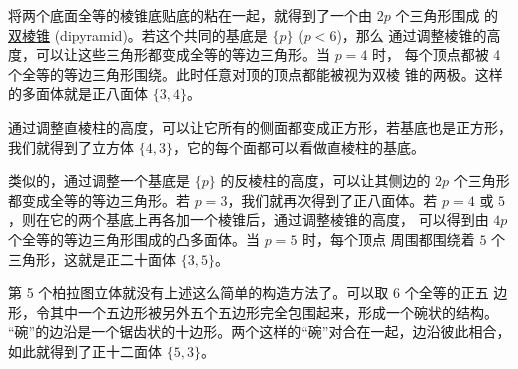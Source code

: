 \documentclass[cs4size,a4paper,adobefonts,openany]{ctexbook}
\newcommand{\pname}[1]{\underline{#1}}
\numberwithin{equation}{section}
\begin{document}
将两个底面全等的棱锥底贴底的粘在一起，就得到了一个由 $2p$ 个三角形围成
的\pname{双棱锥} (dipyramid)。若这个共同的基底是 $\{p\}$ ($p<6$)，那么
通过调整棱锥的高度，可以让这些三角形都变成全等的等边三角形。当 $p=4$ 时，
每个顶点都被 4 个全等的等边三角形围绕。此时任意对顶的顶点都能被视为双棱
锥的两极。这样的多面体就是正八面体 $\{3,4\}$。

通过调整直棱柱的高度，可以让它所有的侧面都变成正方形，若基底也是正方形，
我们就得到了立方体 $\{4,3\}$，它的每个面都可以看做直棱柱的基底。

类似的，通过调整一个基底是 $\{p\}$ 的反棱柱的高度，可以让其侧边的 $2p$
个三角形都变成全等的等边三角形。若 $p=3$，我们就再次得到了正八面体。若
$p=4$ 或 $5$，则在它的两个基底上再各加一个棱锥后，通过调整棱锥的高度，
可以得到由 $4p$ 个全等的等边三角形围成的凸多面体。当 $p=5$ 时，每个顶点
周围都围绕着 $5$ 个三角形，这就是正二十面体 $\{3,5\}$。

第 5 个柏拉图立体就没有上述这么简单的构造方法了。可以取 6 个全等的正五
边形，令其中一个五边形被另外五个五边形完全包围起来，形成一个碗状的结构。
“碗”的边沿是一个锯齿状的十边形。两个这样的“碗”对合在一起，边沿彼此相合，
如此就得到了正十二面体 $\{5,3\}$。
\end{document}
